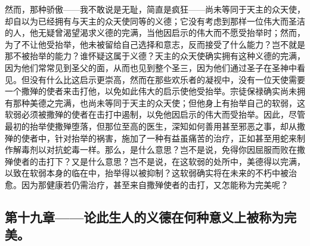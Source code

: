 然而，那种骄傲——我不敢说是无耻，简直是疯狂——尚未等同于天主的众天使，却自以为已经拥有与天主的众天使同等的义德；它没有考虑到那样一位伟大而圣洁的人，他无疑曾渴望渴求义德的完满，当他因启示的伟大而不愿受抬举时；然而，为了不让他受抬举，他未被留给自己选择和意志，反而接受了什么能力？岂不就是那不被抬举的能力？谁怀疑这属于义德？天主的众天使确实拥有这种义德的完满，因为他们常常见到圣父的面，从而也见到整个圣三，因为他们通过圣子在圣神中看见。但没有什么比这启示更崇高，然而在那些欢乐者的凝视中，没有一位天使需要一个撒殚的使者来击打他，以免如此伟大的启示使他受抬举。宗徒保禄确实尚未拥有那种美德之完满，也尚未等同于天主的众天使；但他身上有抬举自己的软弱，这软弱必须被撒殚的使者在击打中遏制，以免他因启示的伟大而受抬举。因此，尽管最初的抬举使撒殚堕落，但那位至高的医生，深知如何善用甚至邪恶之事，却从撒殚的使者中，针对抬举的祸害，施加了一种有益虽痛苦的治疗，正如甚至用蛇来制作解毒剂以对抗蛇毒一样。那么，是什么意思？岂不是说，免得你因屈服而败在撒殚使者的击打下？又是什么意思？岂不是说，在这软弱的处所中，美德得以完满，以致在软弱本身的临在中，抬举得以被抑制？这软弱确实将在未来的不朽中被治愈。因为那健康若仍需治疗，甚至来自撒殚使者的击打，又怎能称为完美呢？\par


\subsection{第十九章——论此生人的义德在何种意义上被称为完美。}

